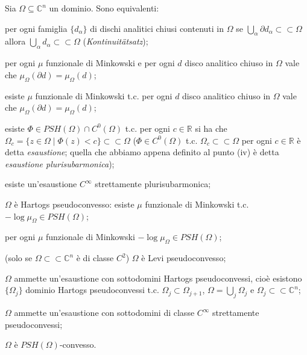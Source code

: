 \begin{thm}
  Sia $\Omega \subseteq \mathbb{C}^n$ un dominio. Sono equivalenti:
  \begin{nlist}
    \item per ogni famiglia $\{d_{\alpha}\}$ di dischi analitici chiusi contenuti in $\Omega$ se $\displaystyle \bigcup_{\alpha} \partial d_{\alpha} \subset\subset \Omega$ allora $\displaystyle \bigcup_{\alpha} d_{\alpha} \subset\subset \Omega$ (\textit{Kontinuitätsatz});
    \item per ogni $\mu$ funzionale di Minkowski e per ogni $d$ disco analitico chiuso in $\Omega$ vale che $\mu_{\Omega}(\partial d)=\mu_{\Omega}(d)$;
    \item esiste $\mu$ funzionale di Minkowski t.c. per ogni $d$ disco analitico chiuso in $\Omega$ vale che $\mu_{\Omega}(\partial d)=\mu_{\Omega}(d)$;
    \item esiste $\Phi \in PSH(\Omega) \cap C^0(\Omega)$ t.c. per ogni $c \in \mathbb{R}$ si ha che $\Omega_c=\{z \in \Omega \mid \Phi(z)<c\} \subset\subset \Omega$
    ($\Phi \in C^0(\Omega)$ t.c. $\Omega_c \subset\subset \Omega$ per ogni $c \in \mathbb{R}$ è detta \textit{esaustione}; quella che abbiamo appena definito al punto (iv) è detta \textit{esaustione plurisubarmonica});
    \item esiste un'esaustione $C^{\infty}$ strettamente plurisubarmonica;
    \item $\Omega$ è Hartogs pseudoconvesso: esiste $\mu$ funzionale di Minkowski t.c. $-\log{\mu_{\Omega}} \in PSH(\Omega)$;
    \item per ogni $\mu$ funzionale di Minkowski $-\log{\mu_{\Omega}} \in PSH(\Omega)$;
    \item (solo se $\Omega \subset\subset \mathbb{C}^n$ è di classe $C^2$) $\Omega$ è Levi pseudoconvesso;
    \item $\Omega$ ammette un'esaustione con sottodomini Hartogs pseudoconvessi, cioè esistono $\{\Omega_j\}$ dominio Hartogs pseudoconvessi t.c. $\Omega_j \subset \Omega_{j+1}$, $\displaystyle \Omega=\bigcup_j \Omega_j$ e $\Omega_j \subset\subset \mathbb{C}^n$;
    \item $\Omega$ ammette un'esaustione con sottodomini di classe $C^{\infty}$ strettamente pseudoconvessi;
    \item $\Omega$ è $PSH(\Omega)$-convesso.
  \end{nlist}
\end{thm}


